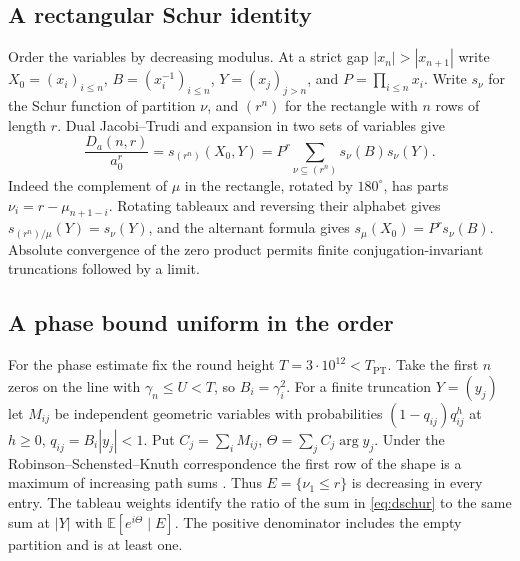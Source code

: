 \documentclass[11pt,a4paper,reqno]{amsart}
\numberwithin{equation}{section}
\begin{document}
\subsection{A rectangular Schur identity}
Order the variables by decreasing modulus. At a strict gap \(|x_n|>|x_{n+1}|\) write \(X_0=(x_i)_{i\le n}\), \(B=(x_i^{-1})_{i\le n}\), \(Y=(x_j)_{j>n}\), and \(P=\prod_{i\le n}x_i\). Write \(s_\nu\) for the Schur function of partition \(\nu\), and \((r^n)\) for the rectangle with \(n\) rows of length \(r\). Dual Jacobi--Trudi and expansion in two sets of variables give \cite[Chap.~I, \S\S3,5]{mac}
\begin{equation}\label{eq:dschur}
 \frac{D_a(n,r)}{a_0^r}=s_{(r^n)}(X_0,Y)
   =P^r\sum_{\nu\subseteq(r^n)}s_\nu(B)s_\nu(Y).
\end{equation}
Indeed the complement of \(\mu\) in the rectangle, rotated by \(180^\circ\), has parts \(\nu_i=r-\mu_{n+1-i}\). Rotating tableaux and reversing their alphabet gives \(s_{(r^n)/\mu}(Y)=s_\nu(Y)\), and the alternant formula gives \(s_\mu(X_0)=P^rs_\nu(B)\). Absolute convergence of the zero product permits finite conjugation-invariant truncations followed by a limit.

\subsection{A phase bound uniform in the order}\label{sec:phase}
For the phase estimate fix the round height \(T=3\cdot10^{12}<T_{\mathrm{PT}}\). Take the first \(n\) zeros on the line with \(\gamma_n\le U<T\), so \(B_i=\gamma_i^2\). For a finite truncation \(Y=(y_j)\) let \(M_{ij}\) be independent geometric variables with probabilities \((1-q_{ij})q_{ij}^h\) at \(h\ge0\), \(q_{ij}=B_i|y_j|<1\). Put \(C_j=\sum_i M_{ij}\), \(\Theta=\sum_j C_j\arg y_j\). Under the Robinson--Schensted--Knuth correspondence the first row of the shape is a maximum of increasing path sums \cite[\S2.1]{joh}. Thus \(E=\{\nu_1\le r\}\) is decreasing in every entry. The tableau weights identify the ratio of the sum in \eqref{eq:dschur} to the same sum at \(|Y|\) with \(\mathbb E[e^{i\Theta}\mid E]\). The positive denominator includes the empty partition and is at least one.
\end{document}
